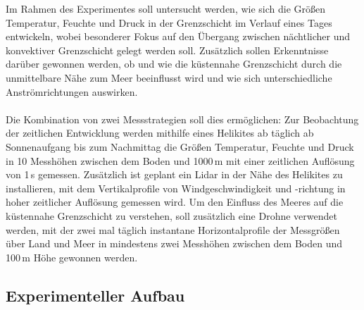 \documentclass[a4paper,11pt,DIV=calc,tablecaptionabove,headinclude,twoside]{article}
\begin{document}
Im Rahmen des Experimentes soll untersucht werden, wie sich die Größen Temperatur, Feuchte und Druck in der Grenzschicht im Verlauf eines Tages entwickeln, wobei besonderer Fokus auf den Übergang zwischen nächtlicher und konvektiver Grenzschicht gelegt werden soll. Zusätzlich sollen Erkenntnisse darüber gewonnen werden, ob und wie die küstennahe Grenzschicht durch die unmittelbare Nähe zum Meer beeinflusst wird und wie sich unterschiedliche Anströmrichtungen auswirken. \\\\
Die Kombination von zwei Messstrategien soll dies ermöglichen: Zur Beobachtung der zeitlichen Entwicklung werden mithilfe eines Helikites ab täglich ab Sonnenaufgang bis zum Nachmittag die Größen Temperatur, Feuchte und Druck in 10 Messhöhen zwischen dem Boden und 1000\,m mit einer zeitlichen Auflösung von 1\,s gemessen. Zusätzlich ist geplant ein Lidar in der Nähe des Helikites zu installieren, mit dem Vertikalprofile von Windgeschwindigkeit und -richtung in hoher zeitlicher Auflösung gemessen wird. %
Um den Einfluss des Meeres auf die küstennahe Grenzschicht zu verstehen, soll zusätzlich eine Drohne verwendet werden, mit der zwei mal täglich instantane Horizontalprofile der Messgrößen über Land und Meer in mindestens zwei Messhöhen zwischen dem Boden und 100\,m Höhe gewonnen werden.
\subsection{Experimenteller Aufbau}
\label{Aufbau}
\end{document}
